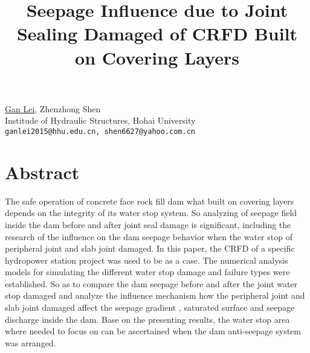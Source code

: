 \title{Seepage Influence due to Joint Sealing Damaged of CRFD Built on Covering Layers}
\author{} \institute{}
\maketitle

\begin{center}
{\large \underline{Gan Lei}, Zhenzhong Shen}\\
Institude of Hydraulic Structures, Hohai University\\
{\tt ganlei2015@hhu.edu.cn, shen6627@yahoo.com.cn}
\end{center}

\section*{Abstract}
The safe operation of concrete face rock fill dam what built on covering layers depends on the integrity of its water stop system. So analyzing of seepage field inside the dam before and after joint seal damage is significant, including the research of the influence on the dam seepage behavior when the water stop of peripheral joint and slab joint damaged. In this paper, the CRFD of a specific hydropower station project was used to be as a case. The numerical analysis models for simulating the different water stop damage and failure types were established. So as to compare the dam seepage before and after the joint water stop damaged and analyze the influence mechanism how the peripheral joint and slab joint damaged affect the seepage gradient , saturated surface and seepage discharge inside the dam. Base on the presenting results, the water stop area where needed to focus on can be ascertained when the dam anti-seepage system was arranged.

